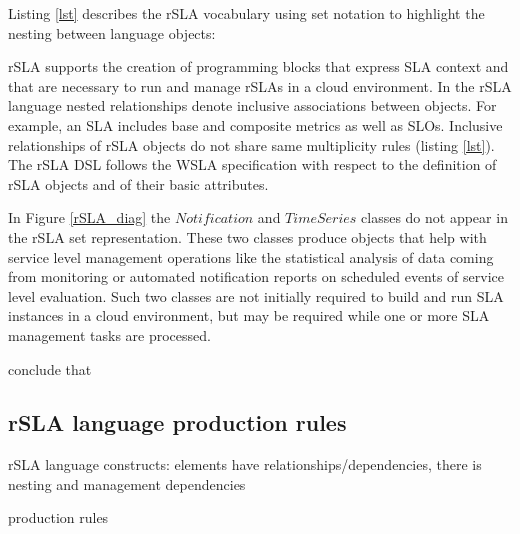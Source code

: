 Listing \ref{lst} describes the rSLA vocabulary using set notation to highlight the nesting between language objects:


rSLA supports the creation of programming blocks that express SLA context and that are necessary to run and manage rSLAs in a cloud environment. 
In the rSLA language nested relationships denote inclusive associations between objects. For example, an SLA includes base and composite metrics as 
well as SLOs. Inclusive relationships of rSLA objects do not share same multiplicity rules (listing \ref{lst}). The rSLA DSL follows the WSLA 
specification \cite{wsla} with respect to the definition of rSLA objects and of their basic attributes.

In Figure \ref{rSLA_diag} the $Notification$ and $TimeSeries$ classes do not appear in the rSLA set representation. These two classes produce objects 
that help with service level management operations like the statistical analysis of data coming from monitoring or automated notification reports on 
scheduled events of service level evaluation. Such two classes are not initially required to build and run SLA instances in a cloud environment, but 
may be required while one or more SLA management tasks are processed.



conclude that
 
\subsection{rSLA language production rules}

rSLA language constructs: elements have relationships/dependencies, there is nesting and management dependencies

production rules
